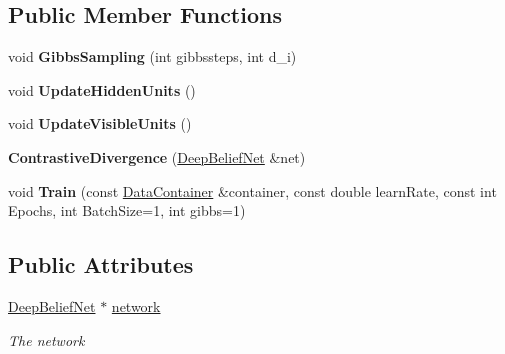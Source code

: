 \subsection*{Public Member Functions}
\begin{DoxyCompactItemize}
\item 
\hypertarget{class_n_n_t_lib_1_1_contrastive_divergence_af8d48ef13d5e30cdde1372425230d82b}{}void {\bfseries Gibbs\+Sampling} (int gibbssteps, int d\+\_\+i)\label{class_n_n_t_lib_1_1_contrastive_divergence_af8d48ef13d5e30cdde1372425230d82b}

\item 
\hypertarget{class_n_n_t_lib_1_1_contrastive_divergence_a8d7e04a31fe118f4678c10a9dfd7876d}{}void {\bfseries Update\+Hidden\+Units} ()\label{class_n_n_t_lib_1_1_contrastive_divergence_a8d7e04a31fe118f4678c10a9dfd7876d}

\item 
\hypertarget{class_n_n_t_lib_1_1_contrastive_divergence_a3f66c00638df080d832bfd38219697b9}{}void {\bfseries Update\+Visible\+Units} ()\label{class_n_n_t_lib_1_1_contrastive_divergence_a3f66c00638df080d832bfd38219697b9}

\item 
\hypertarget{class_n_n_t_lib_1_1_contrastive_divergence_a5f8fe01e199eab56eec930ab6c313eb6}{}{\bfseries Contrastive\+Divergence} (\hyperlink{class_n_n_t_lib_1_1_deep_belief_net}{Deep\+Belief\+Net} \&net)\label{class_n_n_t_lib_1_1_contrastive_divergence_a5f8fe01e199eab56eec930ab6c313eb6}

\item 
\hypertarget{class_n_n_t_lib_1_1_contrastive_divergence_a479055ffdf7289c4726b73137afc287e}{}void {\bfseries Train} (const \hyperlink{class_n_n_t_lib_1_1_data_container}{Data\+Container} \&container, const double learn\+Rate, const int Epochs, int Batch\+Size=1, int gibbs=1)\label{class_n_n_t_lib_1_1_contrastive_divergence_a479055ffdf7289c4726b73137afc287e}

\end{DoxyCompactItemize}
\subsection*{Public Attributes}
\begin{DoxyCompactItemize}
\item 
\hyperlink{class_n_n_t_lib_1_1_deep_belief_net}{Deep\+Belief\+Net} $\ast$ \hyperlink{class_n_n_t_lib_1_1_contrastive_divergence_a922b07047f0dacb946fbbf3828484ad4}{network}
\begin{DoxyCompactList}\small\item\em The network \end{DoxyCompactList}\end{DoxyCompactItemize}
